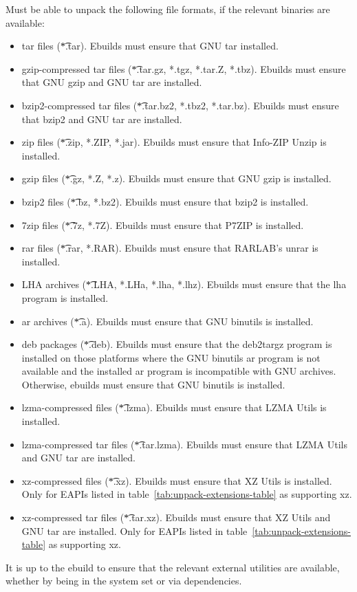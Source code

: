 \begin{description}
     Must be able to unpack the following file formats, if the
    relevant binaries are available:
    \begin{itemize}
    \item tar files (\t{*.tar}). Ebuilds must ensure that GNU tar installed.
    \item gzip-compressed tar files (\t{*.tar.gz, *.tgz, *.tar.Z, *.tbz}). Ebuilds must ensure that
    GNU gzip and GNU tar are installed.
    \item bzip2-compressed tar files (\t{*.tar.bz2, *.tbz2, *.tar.bz}). Ebuilds must ensure that
    bzip2 and GNU tar are installed.
    \item zip files (\t{*.zip, *.ZIP, *.jar}). Ebuilds must ensure that Info-ZIP Unzip is installed.
    \item gzip files (\t{*.gz, *.Z, *.z}). Ebuilds must ensure that GNU gzip is installed.
    \item bzip2 files (\t{*.bz, *.bz2}). Ebuilds must ensure that bzip2 is installed.
    \item 7zip files (\t{*.7z, *.7Z}). Ebuilds must ensure that P7ZIP is installed.
    \item rar files (\t{*.rar, *.RAR}). Ebuilds must ensure that RARLAB's unrar is installed.
    \item LHA archives (\t{*.LHA, *.LHa, *.lha, *.lhz}). Ebuilds must ensure that the lha program is
    installed.
    \item ar archives (\t{*.a}). Ebuilds must ensure that GNU binutils is installed.
    \item deb packages (\t{*.deb}). Ebuilds must ensure that the deb2targz program is installed on
    those platforms where the GNU binutils ar program is not available and the installed ar program is
    incompatible with GNU archives. Otherwise, ebuilds must ensure that GNU binutils is installed.
    \item lzma-compressed files (\t{*.lzma}). Ebuilds must ensure that LZMA Utils is installed.
    \item lzma-compressed tar files (\t{*.tar.lzma}). Ebuilds must ensure that LZMA Utils and
        GNU tar are installed.
    \item xz-compressed files (\t{*.xz}). Ebuilds must ensure that XZ Utils is installed. Only for
        EAPIs listed in table~\ref{tab:unpack-extensions-table} as supporting xz.
    \item xz-compressed tar files (\t{*.tar.xz}). Ebuilds must ensure that XZ Utils and GNU tar are
        installed. Only for EAPIs listed in table~\ref{tab:unpack-extensions-table} as supporting xz.
    \end{itemize}
    It is up to the ebuild to ensure that the relevant external utilities are available, whether by
    being in the system set or via dependencies.


\end{description}
